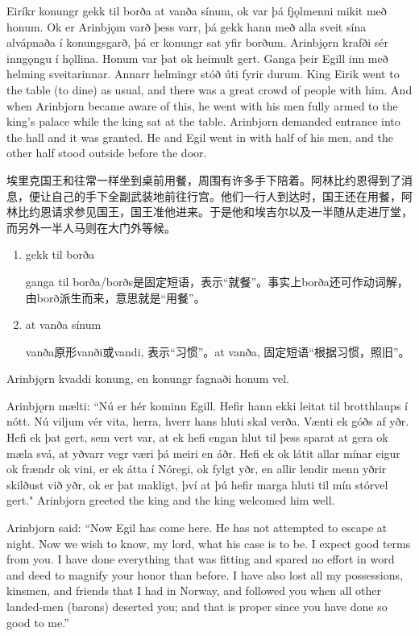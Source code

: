 \begin{paracol}{2}
  Eiríkr konungr gekk til borða at vanða sínum, ok var þá fjǫlmenni mikit með honum. Ok er Arinbjǫm varð þess varr, þá gekk hann með alla sveit sína alvápnaða í konungsgarð, þá er konungr sat yfir borðum. Arinbjǫrn krafði sér inngǫngu í hǫllina. Honum var þat ok heimult gert. Ganga þeir Egill inn með helming sveitarinnar. Annarr helmingr stóð úti fyrir durum.
  \switchcolumn
  King Eirik went to the table (to dine) as usual, and there was a great crowd of people with him. And when Arinbjorn became aware of this, he went with his men fully armed to the king's palace while the king sat at the table. Arinbjorn demanded entrance into the hall and it was granted. He and Egil went in with half of his men, and the other half stood outside before the door.
\end{paracol}

\begin{translation*}{}
  埃里克国王和往常一样坐到桌前用餐，周围有许多手下陪着。阿林比约恩得到了消息，便让自己的手下全副武装地前往行宫。他们一行人到达时，国王还在用餐，阿林比约恩请求参见国王，国王准他进来。于是他和埃吉尔以及一半随从走进厅堂，而另外一半人马则在大门外等候。
\end{translation*}
\begin{grammar*}{}
  \begin{enumerate}[leftmargin=*]
    \item gekk til borða

          ganga til borða/borðs是固定短语，表示“就餐”。事实上borða还可作动词解，由borð派生而来，意思就是“用餐”。
    \item at vanða sínum

          vanða原形vanði或vandi, 表示“习惯”。at vanða, 固定短语“根据习惯，照旧”。
  \end{enumerate}
\end{grammar*}
\begin{paracol}{2}
  Arinbjǫrn kvaddi konung, en konungr fagnaði honum vel.

  Arinbjǫrn mælti: ``Nú er hér kominn Egill. Hefir hann ekki leitat til brotthlaups í nótt. Nú viljum vér vita, herra, hverr hans hluti skal verða. Vænti ek góðs af yðr. Hefi ek þat gert, sem vert var, at ek hefi engan hlut til þess sparat at gera ok mæla svá, at yðvarr vegr væri þá meiri en áðr. Hefi ek ok látit allar mínar eigur ok frændr ok vini, er ek átta í Nóregi, ok fylgt yðr, en allir lendir menn yðrir skilðust við yðr, ok er þat makligt, því at þú hefir marga hluti til mín stórvel gert."
  \switchcolumn
  Arinbjorn greeted the king and the king welcomed him well.

  Arinbjorn said: ``Now Egil has come here. He has not attempted to escape at night. Now we wish to know, my lord, what his case is to be. I expect good terms from you. I have done everything that was fitting and spared no effort in word and deed to magnify your honor than before. I have also lost all my possessions, kinsmen, and friends that I had in Norway, and followed you when all other landed-men (barons) deserted you; and that is proper since you have done so good to me.''
\end{paracol}

